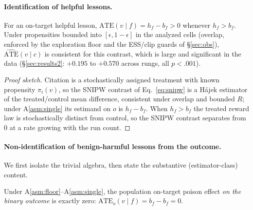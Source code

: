 \paragraph{Identification of helpful lessons.}
\begin{proposition}\label{prop:helpful}
For an on-target helpful lesson, $\mathrm{ATE}(v\mid f)=h_f-b_f>0$ whenever
$h_f>b_f$. Under propensities bounded into $[\epsilon,1{-}\epsilon]$ in the analyzed
cells (overlap, enforced by the exploration floor and the ESS/clip guards of
\S\ref{sec:obs}), $\widehat{\mathrm{ATE}}(v\mid c)$ is consistent for this contrast,
which is large and significant in the data (\S\ref{sec:results2}: $+0.195$ to $+0.570$
across rungs, all $p<.001$).
\end{proposition}
\begin{proof}[Proof sketch]
Citation is a stochastically assigned treatment with known propensity $\pi_i(v)$, so
the SNIPW contrast of Eq.~\eqref{eq:snipw} is a H\'ajek estimator of the
treated/control mean difference, consistent under overlap and bounded $R$; under
A\ref{asm:single} its estimand on $o$ is $h_f-b_f$. When $h_f>b_f$ the treated reward
law is stochastically distinct from control, so the SNIPW contrast separates from $0$
at a rate growing with the run count.
\end{proof}

\paragraph{Non-identification of benign-harmful lessons from the outcome.}
We first isolate the trivial algebra, then state the substantive (estimator-class)
content.

\begin{lemma}\label{lem:zero}
Under A\ref{asm:floor}--A\ref{asm:single}, the population on-target poison effect
\emph{on the binary outcome} is exactly zero:
$\mathrm{ATE}_{o}(v\mid f)=b_f-b_f=0$.
\end{lemma}

